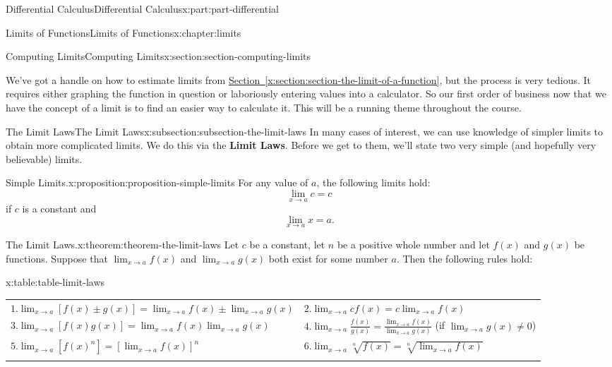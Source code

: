 \documentclass[twoside,10pt,]{book}
\newcommand{\tabularfont}{\relax}
\newcommand{\xreffont}{\relax}
\newcommand{\terminology}[1]{\textbf{#1}}
\numberwithin{equation}{part}
\newcommand{\hrulethick} {\noalign{\hrule height 0.11em}}
\begin{document}
\begin{partptx}{Differential Calculus}{}{Differential Calculus}{}{}{x:part:part-differential}
\begin{chapterptx}{Limits of Functions}{}{Limits of Functions}{}{}{x:chapter:limits}
\begin{sectionptx}{Computing Limits}{}{Computing Limits}{}{}{x:section:section-computing-limits}
\begin{introduction}{}
We've got a handle on how to estimate limits from \hyperref[x:section:section-the-limit-of-a-function]{Section~{\xreffont\ref{x:section:section-the-limit-of-a-function}}}, but the process is very tedious. It requires either graphing the function in question or laboriously entering values into a calculator. So our first order of business now that we have the concept of a limit is to find an easier way to calculate it. This will be a running theme throughout the course.%
\end{introduction}%
%
%
\typeout{************************************************}
\typeout{************************************************}
%
\begin{subsectionptx}{The Limit Laws}{}{The Limit Laws}{}{}{x:subsection:subsection-the-limit-laws}
In many cases of interest, we can use knowledge of simpler limits to obtain more complicated limits. We do this via the \terminology{Limit Laws}. Before we get to them, we'll state two very simple (and hopefully very believable) limits.%
\begin{proposition}{Simple Limits.}{}{x:proposition:proposition-simple-limits}%
For any value of \(a\), the following limits hold:%
\begin{equation*}
\lim_{x\to a}c = c
\end{equation*}
if \(c\) is a constant and%
\begin{equation*}
\lim_{x\to a}x = a.
\end{equation*}
%
\end{proposition}
\begin{theorem}{The Limit Laws.}{}{x:theorem:theorem-the-limit-laws}%
Let \(c\) be a constant, let \(n\) be a positive whole number and let \(f(x)\) and \(g(x)\) be functions. Suppose that \(\lim_{x\to a}f(x)\) and \(\lim_{x\to a}g(x)\) both exist for some number \(a\). Then the following rules hold:%
\begin{tableptx}{\textbf{}}{x:table:table-limit-laws}{}%
\centering%
{\tabularfont%
\begin{tabular}{ll}\hrulethick
\(1. \lim_{x\to a}[f(x)\pm g(x)] = \lim_{x\to a}f(x)\pm \lim_{x\to a}g(x)\)&\(2. \lim_{x\to a}cf(x) = c\lim_{x\to a}f(x)\)\tabularnewline[0pt]
\(3. \lim_{x\to a}[f(x)g(x)] = \lim_{x\to a}f(x)\lim_{x\to a}g(x)\)&\(4. \lim_{x\to a}\frac{f(x)}{g(x)} = \frac{\lim_{x\to a}f(x)}{\lim_{x\to a}g(x)}\) (if \(\lim_{x\to a}g(x)\neq 0\))\tabularnewline[0pt]
\(5. \lim_{x\to a}[f(x)^{n}] = [\lim_{x\to a}f(x)]^{n}\)&\(6. \lim_{x\to a}\sqrt[n]{f(x)} = \sqrt[n]{\lim_{x\to a}f(x)}\)\tabularnewline\hrulethick

\end{tabular}}
\end{tableptx}
\end{theorem}
\end{subsectionptx}
\end{sectionptx}
\end{chapterptx}
\end{partptx}
\end{document}
